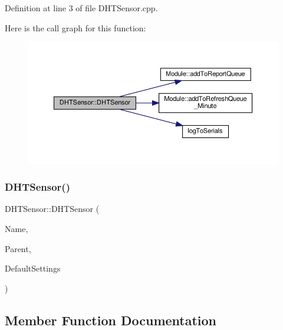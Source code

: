 Definition at line 3 of file D\+H\+T\+Sensor.\+cpp.

Here is the call graph for this function\+:
\nopagebreak
\begin{figure}[H]
\begin{center}
\leavevmode
\includegraphics[width=350pt]{class_d_h_t_sensor_a75c40cadfc569af7abf80b2cb557b296_cgraph}
\end{center}
\end{figure}
\mbox{\label{class_d_h_t_sensor_a75c40cadfc569af7abf80b2cb557b296}} 
\subsubsection{\texorpdfstring{D\+H\+T\+Sensor()}{DHTSensor()}\hspace{0.1cm}{\footnotesize\ttfamily [2/2]}}
{\footnotesize\ttfamily D\+H\+T\+Sensor\+::\+D\+H\+T\+Sensor (\begin{DoxyParamCaption}\item[{const \+\_\+\+\_\+\+Flash\+String\+Helper $\ast$}]{Name,  }\item[{\hyperlink{class_module}{Module} $\ast$}]{Parent,  }\item[{\hyperlink{struct_settings_1_1_d_h_t_sensor_settings}{Settings\+::\+D\+H\+T\+Sensor\+Settings} $\ast$}]{Default\+Settings }\end{DoxyParamCaption})}



\subsection{Member Function Documentation}
\mbox{\label{class_d_h_t_sensor_a522c1a47a86f3908581ff283ca3c61ec}} 
